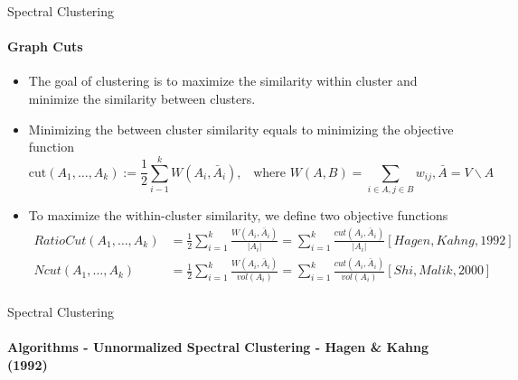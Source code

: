\documentclass[10pt,a4paper, nocenter]{beamer}
\begin{document}
	\begin{frame}{Spectral Clustering}
		\framesubtitle{Graph Cuts}
		\begin{itemize}
			\item<1-> The goal of clustering is to maximize the similarity within cluster and minimize the similarity between clusters.
			\item<2-> Minimizing the between cluster similarity equals to minimizing the objective function $$  \text{cut}(A_{1}, \dots, A_{k}) := \frac{1}{2}\sum_{i-1}^{k}W(A_i,\bar{A}_{i}),\hspace{10pt} \text{where }W(A,B) = \sum_{i\in A, j\in B}w_{ij}, \bar{A} = V \backslash A $$
			\item<3-> To maximize the within-cluster similarity, we define two objective functions \begin{align*} RatioCut(A_{1},\dots,A_{k}) &= \frac{1}{2} \sum_{i=1}^{k}\frac{W(A_{i},\bar{A}_{i})}{\lvert A_{i} \rvert}
				= \sum_{i=1}^{k}\frac{cut(A_{i},\bar{A}_{i})}{\lvert A_{i} \rvert} [Hagen, Kahng,  1992]\\
				Ncut(A_{1},\dots,A_{k}) &= \frac{1}{2}\sum_{i=1}^{k}\frac{W(A_{i},\bar{A}_{i})}{vol(A_{i})} = 
				\sum_{i=1}^{k}\frac{cut(A_{i},\bar{A}_{i})}{vol(A_{i})} [Shi, Malik, 2000]\\
			\end{align*}
			
		\end{itemize}
	\end{frame}

	\begin{frame}{Spectral Clustering}
		\framesubtitle{Algorithms - Unnormalized Spectral Clustering - Hagen \& Kahng (1992)}
		\begin{algorithm}[H]
			\DontPrintSemicolon
		\end{algorithm}		
	\end{frame}
\end{document}
